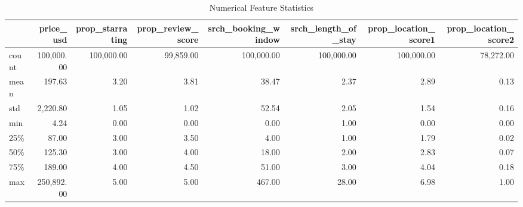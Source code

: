 \begin{table}
\caption{Numerical Feature Statistics}
\label{tab:numerical_stats}
\begin{tabular}{lrrrrrrr}
\toprule
 & price\_usd & prop\_starrating & prop\_review\_score & srch\_booking\_window & srch\_length\_of\_stay & prop\_location\_score1 & prop\_location\_score2 \\
\midrule
count & 100,000.00 & 100,000.00 & 99,859.00 & 100,000.00 & 100,000.00 & 100,000.00 & 78,272.00 \\
mean & 197.63 & 3.20 & 3.81 & 38.47 & 2.37 & 2.89 & 0.13 \\
std & 2,220.80 & 1.05 & 1.02 & 52.54 & 2.05 & 1.54 & 0.16 \\
min & 4.24 & 0.00 & 0.00 & 0.00 & 1.00 & 0.00 & 0.00 \\
25\% & 87.00 & 3.00 & 3.50 & 4.00 & 1.00 & 1.79 & 0.02 \\
50\% & 125.30 & 3.00 & 4.00 & 18.00 & 2.00 & 2.83 & 0.07 \\
75\% & 189.00 & 4.00 & 4.50 & 51.00 & 3.00 & 4.04 & 0.18 \\
max & 250,892.00 & 5.00 & 5.00 & 467.00 & 28.00 & 6.98 & 1.00 \\
\bottomrule
\end{tabular}
\end{table}
